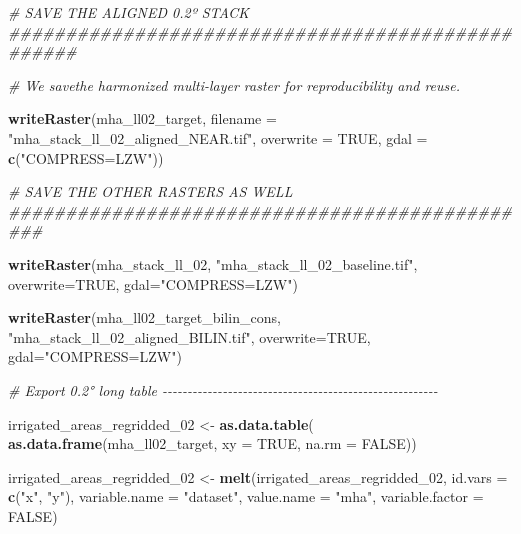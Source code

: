 \documentclass[
  11pt,
]{article}
\newenvironment{Shaded}{\begin{snugshade}}{\end{snugshade}}
\newcommand{\AttributeTok}[1]{\textcolor[rgb]{0.13,0.29,0.53}{#1}}
\newcommand{\CommentTok}[1]{\textcolor[rgb]{0.56,0.35,0.01}{\textit{#1}}}
\newcommand{\ConstantTok}[1]{\textcolor[rgb]{0.56,0.35,0.01}{#1}}
\newcommand{\FunctionTok}[1]{\textcolor[rgb]{0.13,0.29,0.53}{\textbf{#1}}}
\newcommand{\NormalTok}[1]{#1}
\newcommand{\OtherTok}[1]{\textcolor[rgb]{0.56,0.35,0.01}{#1}}
\newcommand{\StringTok}[1]{\textcolor[rgb]{0.31,0.60,0.02}{#1}}
\begin{document}
\begin{Shaded}
\begin{Highlighting}[]
\CommentTok{\# SAVE THE ALIGNED 0.2º STACK \#\#\#\#\#\#\#\#\#\#\#\#\#\#\#\#\#\#\#\#\#\#\#\#\#\#\#\#\#\#\#\#\#\#\#\#\#\#\#\#\#\#\#\#\#\#\#\#\#\#}

\CommentTok{\# We savethe harmonized multi{-}layer raster for reproducibility and reuse.}

\FunctionTok{writeRaster}\NormalTok{(mha\_ll02\_target, }\AttributeTok{filename =} \StringTok{"mha\_stack\_ll\_02\_aligned\_NEAR.tif"}\NormalTok{,}
            \AttributeTok{overwrite =} \ConstantTok{TRUE}\NormalTok{, }\AttributeTok{gdal =} \FunctionTok{c}\NormalTok{(}\StringTok{"COMPRESS=LZW"}\NormalTok{))}

\CommentTok{\# SAVE THE OTHER RASTERS AS WELL \#\#\#\#\#\#\#\#\#\#\#\#\#\#\#\#\#\#\#\#\#\#\#\#\#\#\#\#\#\#\#\#\#\#\#\#\#\#\#\#\#\#\#\#\#\#\#}

\FunctionTok{writeRaster}\NormalTok{(mha\_stack\_ll\_02, }\StringTok{"mha\_stack\_ll\_02\_baseline.tif"}\NormalTok{, }\AttributeTok{overwrite=}\ConstantTok{TRUE}\NormalTok{, }\AttributeTok{gdal=}\StringTok{"COMPRESS=LZW"}\NormalTok{)}

\FunctionTok{writeRaster}\NormalTok{(mha\_ll02\_target\_bilin\_cons, }\StringTok{"mha\_stack\_ll\_02\_aligned\_BILIN.tif"}\NormalTok{, }\AttributeTok{overwrite=}\ConstantTok{TRUE}\NormalTok{, }\AttributeTok{gdal=}\StringTok{"COMPRESS=LZW"}\NormalTok{)}

\CommentTok{\# Export 0.2° long table {-}{-}{-}{-}{-}{-}{-}{-}{-}{-}{-}{-}{-}{-}{-}{-}{-}{-}{-}{-}{-}{-}{-}{-}{-}{-}{-}{-}{-}{-}{-}{-}{-}{-}{-}{-}{-}{-}{-}{-}{-}{-}{-}{-}{-}{-}{-}{-}{-}{-}{-}{-}{-}{-}{-}}

\NormalTok{irrigated\_areas\_regridded\_02 }\OtherTok{\textless{}{-}} \FunctionTok{as.data.table}\NormalTok{(}
  \FunctionTok{as.data.frame}\NormalTok{(mha\_ll02\_target, }\AttributeTok{xy =} \ConstantTok{TRUE}\NormalTok{, }\AttributeTok{na.rm =} \ConstantTok{FALSE}\NormalTok{))}

\NormalTok{irrigated\_areas\_regridded\_02 }\OtherTok{\textless{}{-}} \FunctionTok{melt}\NormalTok{(irrigated\_areas\_regridded\_02,}
                                     \AttributeTok{id.vars =} \FunctionTok{c}\NormalTok{(}\StringTok{"x"}\NormalTok{, }\StringTok{"y"}\NormalTok{),}
                                     \AttributeTok{variable.name =} \StringTok{"dataset"}\NormalTok{,}
                                     \AttributeTok{value.name =} \StringTok{"mha"}\NormalTok{,}
                                     \AttributeTok{variable.factor =} \ConstantTok{FALSE}\NormalTok{)}


\end{Highlighting}
\end{Shaded}
\end{document}
